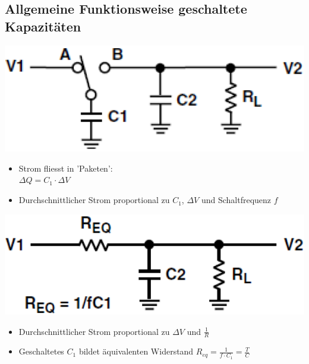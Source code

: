 \subsection{Allgemeine Funktionsweise geschaltete Kapazitäten}

\begin{minipage}[c]{0.46\columnwidth}
    \begin{center}
    \end{center}
    \includegraphics[width=\columnwidth]{images/sc_allgemein.png} 

    \begin{itemize}
        \item Strom fliesst in 'Paketen': \\
            $\Delta Q = C_1 \cdot \Delta V$ 
        \item Durchschnittlicher Strom proportional zu $C_1$, $\Delta V$ und Schaltfrequenz $f$
    \end{itemize}

\end{minipage}
\hfill
\begin{minipage}[c]{0.46\columnwidth}
    \begin{center}
    \end{center}
    \includegraphics[width=\columnwidth]{images/rc_allgemein.png}

    \begin{itemize}
        \item Durchschnittlicher Strom proportional zu $\Delta V$ und $\frac{1}{R}$
        \item Geschaltetes $C_1$ bildet äquivalenten Widerstand $R_{eq} = \frac{1}{f \cdot C_1} = \frac{T}{C}$
    \end{itemize}
\end{minipage}

